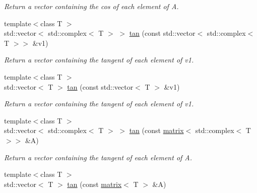 \begin{DoxyCompactItemize}
\begin{DoxyCompactList}\small\item\em Return a vector containing the cos of each element of A. \end{DoxyCompactList}\item 
\hypertarget{namespacekeycpp_a1fbb76498765f30f7a95c80ce7491d28}{{\footnotesize template$<$class T $>$ }\\std\-::vector$<$ std\-::complex$<$ T $>$ $>$ \hyperlink{namespacekeycpp_a1fbb76498765f30f7a95c80ce7491d28}{tan} (const std\-::vector$<$ std\-::complex$<$ T $>$$>$ \&v1)}\label{namespacekeycpp_a1fbb76498765f30f7a95c80ce7491d28}

\begin{DoxyCompactList}\small\item\em Return a vector containing the tangent of each element of v1. \end{DoxyCompactList}\item 
\hypertarget{namespacekeycpp_ae4fe8a3edd9841d208cc044f79d48ae2}{{\footnotesize template$<$class T $>$ }\\std\-::vector$<$ T $>$ \hyperlink{namespacekeycpp_ae4fe8a3edd9841d208cc044f79d48ae2}{tan} (const std\-::vector$<$ T $>$ \&v1)}\label{namespacekeycpp_ae4fe8a3edd9841d208cc044f79d48ae2}

\begin{DoxyCompactList}\small\item\em Return a vector containing the tangent of each element of v1. \end{DoxyCompactList}\item 
\hypertarget{namespacekeycpp_a6a91266a8d14f0ae2de1d3e098d05e41}{{\footnotesize template$<$class T $>$ }\\std\-::vector$<$ std\-::complex$<$ T $>$ $>$ \hyperlink{namespacekeycpp_a6a91266a8d14f0ae2de1d3e098d05e41}{tan} (const \hyperlink{classkeycpp_1_1matrix}{matrix}$<$ std\-::complex$<$ T $>$$>$ \&A)}\label{namespacekeycpp_a6a91266a8d14f0ae2de1d3e098d05e41}

\begin{DoxyCompactList}\small\item\em Return a vector containing the tangent of each element of A. \end{DoxyCompactList}\item 
\hypertarget{namespacekeycpp_aa8cf9e0ed2f49b902c93be19ea6ef147}{{\footnotesize template$<$class T $>$ }\\std\-::vector$<$ T $>$ \hyperlink{namespacekeycpp_aa8cf9e0ed2f49b902c93be19ea6ef147}{tan} (const \hyperlink{classkeycpp_1_1matrix}{matrix}$<$ T $>$ \&A)}\label{namespacekeycpp_aa8cf9e0ed2f49b902c93be19ea6ef147}


\end{DoxyCompactItemize}

